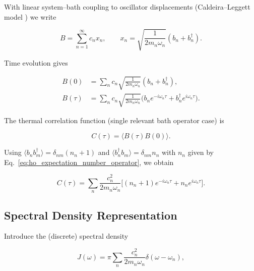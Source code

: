 \noindent
With linear system--bath coupling to oscillator displacements (Caldeira--Leggett model \cite{hagstrommorrison2011caldeiraleggettmodel}) we write

\begin{equation} \label{eq:ho_bath_operator}
	B = \sum_{n=1}^{\infty} c_n x_n, \qquad x_n = \sqrt{\frac{1}{2 m_n \omega_n}} (b_n + b_n^{\dagger}).
\end{equation}

\noindent
Time evolution gives

\begin{align}
	B(0)    & = \sum_{n} c_n \sqrt{\frac{1}{2 m_n \omega_n}} (b_n + b_n^{\dagger}), \label{eq:ho_bath_operator_t0}                                                   \\
	B(\tau) & = \sum_{n} c_n \sqrt{\frac{1}{2 m_n \omega_n}} \Big(b_n e^{-i \omega_n \tau} + b_n^{\dagger} e^{i \omega_n \tau}\Big). \label{eq:ho_bath_operator_tau}
\end{align}

\noindent
The thermal correlation function (single relevant bath operator case) is

\begin{equation} \label{eq:ho_bath_correlator}
	C(\tau) = \langle B(\tau) B(0) \rangle.
\end{equation}

\noindent
Using $\langle b_n b_m^{\dagger} \rangle = \delta_{nm}(n_n+1)$ and $\langle b_n^{\dagger} b_m \rangle = \delta_{nm} n_n$ with $n_n$ given by Eq.~\eqref{eq:ho_expectation_number_operator}, we obtain

\begin{equation} \label{eq:ho_correlator_result}
	C(\tau) = \sum_{n} \frac{c_n^2}{2 m_n \omega_n} \Big[(n_n+1) e^{-i \omega_n \tau} + n_n e^{i \omega_n \tau}\Big].
\end{equation}


\subsection{Spectral Density Representation}
\label{subsec:ho_spectral_density}

\noindent
Introduce the (discrete) spectral density

\begin{equation} \label{eq:ho_bath_spectral_density}
	J(\omega) = \pi \sum_{n} \frac{c_n^2}{2 m_n \omega_n} \delta(\omega - \omega_n),
\end{equation}

